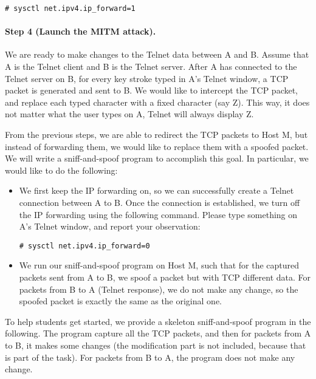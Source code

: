 \begin{lstlisting}
# sysctl net.ipv4.ip_forward=1
\end{lstlisting}

\paragraph{Step 4 (Launch the MITM attack).} We are ready to make changes to the Telnet data
between A and B. Assume that A is the Telnet client and B is the Telnet server. After A has
connected to the Telnet server on B, for every key stroke typed in A's Telnet window, a TCP
packet is generated and sent to B. We would like to intercept the TCP packet, and replace each
typed character with a fixed character (say Z). This way, it does not matter what the user
types on A, Telnet will always display Z.

From the previous steps, we are able to redirect the TCP packets to Host M, but instead of
forwarding them, we would like to replace them with a spoofed packet. We will write a
sniff-and-spoof program to accomplish this goal. In particular, we would like to do the
following: 

\begin{itemize}

\item We first keep the IP forwarding on, so we can successfully create a Telnet connection
between A to B. Once the connection is established, we turn off the IP forwarding using the
following command. Please type something on A's Telnet window, and report your observation: 

\begin{lstlisting}
# sysctl net.ipv4.ip_forward=0
\end{lstlisting}

\item We run our sniff-and-spoof program on Host M, such that for the captured packets sent
from A to B,  we spoof a packet but with TCP different data. For packets from B to A (Telnet
response), we do not make any change, so the spoofed packet is exactly the same as the original
one. 
\end{itemize} 

To help students get started, we provide a skeleton sniff-and-spoof
program in the following. The program capture all the TCP packets, and 
then for packets from A to B, it makes some changes (the modification
part is not included, because that is part of the task). For packets from
B to A, the program does not make any change.  

